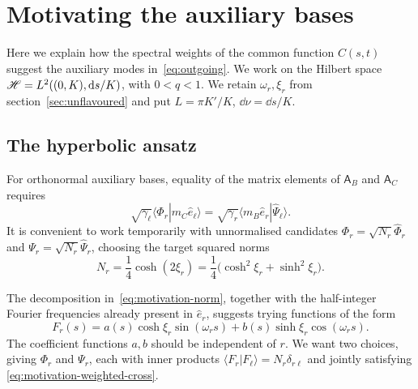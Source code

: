 \section{Motivating the auxiliary bases}
\label{app:mode-motivation}
Here we explain how the spectral weights of the common function $C(s,t)$ suggest
the auxiliary modes in~\eqref{eq:outgoing}. We work on the Hilbert
space $\mathscr H=L^2((0,K),\mathrm d s/K)$, with $0<q<1$.
We retain $\omega_r,\xi_r$ from section~\ref{sec:unflavoured}
and put $L=\pi K'/K$, $\dd\nu=\dd s/K$.

\subsection{The hyperbolic ansatz}
For orthonormal auxiliary bases, equality of the matrix elements of $\mathsf
A_B$ and $\mathsf A_C$ requires
\begin{equation}
  \sqrt{\gamma_\ell}
  \langle\hat{\Phi}_r|m_C \hat{e}_\ell\rangle
  =\sqrt{\gamma_r}
  \langle m_B \hat{e}_r|\hat{\Psi}_\ell\rangle.
  \label{eq:motivation-weighted-cross}
\end{equation}
It is convenient to work temporarily with unnormalised candidates
$\Phi_r=\sqrt{N_r}\hat{\Phi}_r$ and
$\Psi_r=\sqrt{N_r}\hat{\Psi}_r$, choosing the target squared norms
\begin{equation}
  N_r
  =\frac14\cosh(2\xi_r)
  =\frac14\bigl(\cosh^2\xi_r+\sinh^2\xi_r\bigr).
  \label{eq:motivation-norm}
\end{equation}

The decomposition in~\eqref{eq:motivation-norm}, together with the half-integer
Fourier frequencies already present in $\hat{e}_r$, suggests trying
functions of the form
\begin{equation}
  F_r(s)=a(s)\cosh\xi_r\sin(\omega_rs)
  +b(s)\sinh\xi_r\cos(\omega_rs).
  \label{eq:motivation-ansatz}
\end{equation}
The coefficient functions $a,b$ should be independent of $r$. We want two
choices, giving $\Phi_r$ and $\Psi_r$, each with inner products
$\langle F_r|F_\ell\rangle=N_r\delta_{r\ell}$ and jointly satisfying
\eqref{eq:motivation-weighted-cross}.

